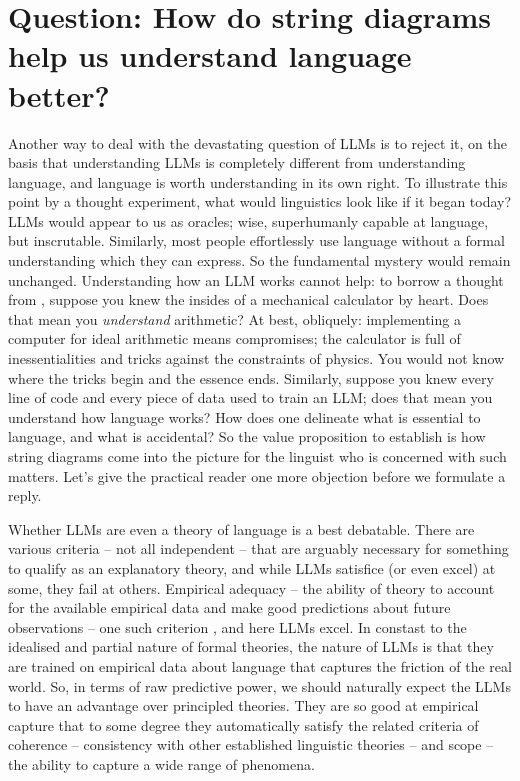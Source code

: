 \section{\textbf{Question:} How do string diagrams help us understand language better?}

Another way to deal with the devastating question of LLMs is to reject it, on the basis that understanding LLMs is completely different from understanding language, and language is worth understanding in its own right. To illustrate this point by a thought experiment, what would linguistics look like if it began today? LLMs would appear to us as oracles; wise, superhumanly capable at language, but inscrutable. Similarly, most people effortlessly use language without a formal understanding which they can express. So the fundamental mystery would remain unchanged. Understanding how an LLM works cannot help: to borrow a thought from \citep{}, suppose you knew the insides of a mechanical calculator by heart. Does that mean you \emph{understand} arithmetic? At best, obliquely: implementing a computer for ideal arithmetic means compromises; the calculator is full of inessentialities and tricks against the constraints of physics. You would not know where the tricks begin and the essence ends. Similarly, suppose you knew every line of code and every piece of data used to train an LLM; does that mean you understand how language works? How does one delineate what is essential to language, and what is accidental? So the value proposition to establish is how string diagrams come into the picture for the linguist who is concerned with such matters. Let's give the practical reader one more objection before we formulate a reply.


Whether LLMs are even a theory of language is a best debatable. There are various criteria -- not all independent -- that are arguably necessary for something to qualify as an explanatory theory, and while LLMs satisfice (or even excel) at some, they fail at others. Empirical adequacy -- the ability of theory to account for the available empirical data and make good predictions about future observations -- one such criterion \citep{}, and here LLMs excel. In constast to the idealised and partial nature of formal theories, the nature of LLMs is that they are trained on empirical data about language that captures the friction of the real world. So, in terms of raw predictive power, we should naturally expect the LLMs to have an advantage over principled theories. They are so good at empirical capture that to some degree they automatically satisfy the related criteria of coherence -- consistency with other established linguistic theories -- and scope -- the ability to capture a wide range of phenomena.\\

